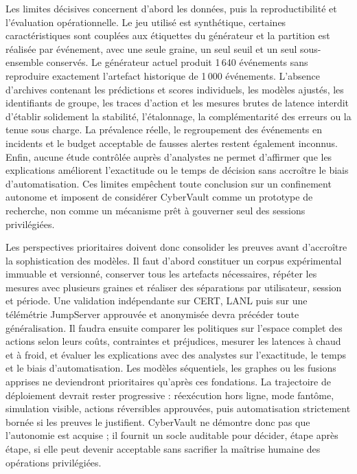 \documentclass[11pt,a4paper,oneside]{report}
\theoremstyle{definition}
\theoremstyle{plain}
\begin{document}
Les limites décisives concernent d'abord les données, puis la reproductibilité et l'évaluation opérationnelle. Le jeu utilisé est synthétique, certaines caractéristiques sont couplées aux étiquettes du générateur et la partition est réalisée par événement, avec une seule graine, un seul seuil et un seul sous-ensemble conservés. Le générateur actuel produit 1\,640 événements sans reproduire exactement l'artefact historique de 1\,000 événements. L'absence d'archives contenant les prédictions et scores individuels, les modèles ajustés, les identifiants de groupe, les traces d'action et les mesures brutes de latence interdit d'établir solidement la stabilité, l'étalonnage, la complémentarité des erreurs ou la tenue sous charge. La prévalence réelle, le regroupement des événements en incidents et le budget acceptable de fausses alertes restent également inconnus. Enfin, aucune étude contrôlée auprès d'analystes ne permet d'affirmer que les explications améliorent l'exactitude ou le temps de décision sans accroître le biais d'automatisation. Ces limites empêchent toute conclusion sur un confinement autonome et imposent de considérer CyberVault comme un prototype de recherche, non comme un mécanisme prêt à gouverner seul des sessions privilégiées.

Les perspectives prioritaires doivent donc consolider les preuves avant d'accroître la sophistication des modèles. Il faut d'abord constituer un corpus expérimental immuable et versionné, conserver tous les artefacts nécessaires, répéter les mesures avec plusieurs graines et réaliser des séparations par utilisateur, session et période. Une validation indépendante sur CERT, LANL puis sur une télémétrie JumpServer approuvée et anonymisée devra précéder toute généralisation. Il faudra ensuite comparer les politiques sur l'espace complet des actions selon leurs coûts, contraintes et préjudices, mesurer les latences à chaud et à froid, et évaluer les explications avec des analystes sur l'exactitude, le temps et le biais d'automatisation. Les modèles séquentiels, les graphes ou les fusions apprises ne deviendront prioritaires qu'après ces fondations. La trajectoire de déploiement devrait rester progressive : réexécution hors ligne, mode fantôme, simulation visible, actions réversibles approuvées, puis automatisation strictement bornée si les preuves le justifient. CyberVault ne démontre donc pas que l'autonomie est acquise ; il fournit un socle auditable pour décider, étape après étape, si elle peut devenir acceptable sans sacrifier la maîtrise humaine des opérations privilégiées.
\end{document}

